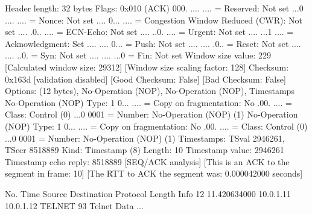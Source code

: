    Header length: 32 bytes
    Flags: 0x010 (ACK)
        000. .... .... = Reserved: Not set
        ...0 .... .... = Nonce: Not set
        .... 0... .... = Congestion Window Reduced (CWR): Not set
        .... .0.. .... = ECN-Echo: Not set
        .... ..0. .... = Urgent: Not set
        .... ...1 .... = Acknowledgment: Set
        .... .... 0... = Push: Not set
        .... .... .0.. = Reset: Not set
        .... .... ..0. = Syn: Not set
        .... .... ...0 = Fin: Not set
    Window size value: 229
    [Calculated window size: 29312]
    [Window size scaling factor: 128]
    Checksum: 0x163d [validation disabled]
        [Good Checksum: False]
        [Bad Checksum: False]
    Options: (12 bytes), No-Operation (NOP), No-Operation (NOP), Timestamps
        No-Operation (NOP)
            Type: 1
                0... .... = Copy on fragmentation: No
                .00. .... = Class: Control (0)
                ...0 0001 = Number: No-Operation (NOP) (1)
        No-Operation (NOP)
            Type: 1
                0... .... = Copy on fragmentation: No
                .00. .... = Class: Control (0)
                ...0 0001 = Number: No-Operation (NOP) (1)
        Timestamps: TSval 2946261, TSecr 8518889
            Kind: Timestamp (8)
            Length: 10
            Timestamp value: 2946261
            Timestamp echo reply: 8518889
    [SEQ/ACK analysis]
        [This is an ACK to the segment in frame: 10]
        [The RTT to ACK the segment was: 0.000042000 seconds]

No.     Time           Source                Destination           Protocol Length Info
     12 11.420634000   10.0.1.11             10.0.1.12             TELNET   93     Telnet Data ...

